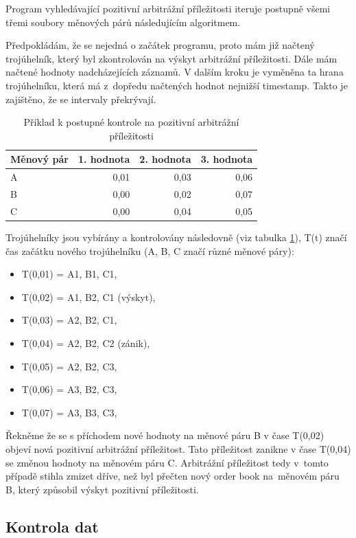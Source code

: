 \documentclass[thesis=B,czech]{FITthesis}[2019/03/21]
\begin{document}
Program vyhledávající pozitivní arbitrážní příležitosti iteruje postupně všemi třemi soubory měnových párů následujícím algoritmem. 

Předpokládám, že se nejedná o začátek programu, proto mám již načtený trojúhelník, který byl zkontrolován na výskyt arbitrážní příležitosti. Dále mám načtené hodnoty nadcházejících záznamů. V dalším kroku je vyměněna ta hrana trojúhelníku, která má z~dopředu načtených hodnot nejnižší timestamp. Takto je zajištěno, že se intervaly překrývají. 

\begin{table}\centering
\caption{Příklad k postupné kontrole na pozitivní arbitrážní příležitosti}
\label{timestamp_example}
\begin{tabular}{|| l | r | r | r ||}\hline Měnový pár & 1. hodnota & 2. hodnota & 3. hodnota\\ [0.5ex]
 \hline
 \hline A & 0,01 & 0,03 & 0,06\\ 
 \hline B & 0,00 & 0,02 & 0,07\\ 
 \hline C & 0,00 & 0,04 & 0,05\\ 
 \hline
\end{tabular}
\end{table}

Trojúhelníky jsou vybírány a kontrolovány následovně (viz tabulka \ref{timestamp_example}), T(t) značí čas začátku nového trojúhelníku (A, B, C značí různé měnové páry):
\begin{itemize}
    \item T(0,01) = A1, B1, C1,
    \item T(0,02) = A1, B2, C1 (výskyt),
    \item T(0,03) = A2, B2, C1,
    \item T(0,04) = A2, B2, C2 (zánik),
    \item T(0,05) = A2, B2, C3,
    \item T(0,06) = A3, B2, C3,
    \item T(0,07) = A3, B3, C3,
\end{itemize}

Řekněme že se s příchodem nové hodnoty na měnové páru B v čase T(0,02) objeví nová pozitivní arbitrážní příležitost. Tato příležitost zanikne v čase T(0,04) se změnou hodnoty na měnovém páru C. Arbitrážní příležitost tedy v~tomto případě stihla zmizet dříve, než byl přečten nový order book na~měnovém páru B, který způsobil výskyt pozitivní příležitosti. 
\subsection{Kontrola dat}
\end{document}

